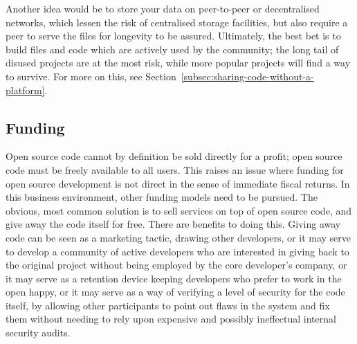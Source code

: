 Another idea would be to store your data on peer-to-peer or decentralised networks, which lessen the risk of centralised storage facilities, but also require a peer to serve the files for longevity to be assured. Ultimately, the best bet is to build files and code which are actively used by the community; the long tail of disused projects are at the most risk, while more popular projects will find a way to survive. For more on this, see Section~\ref{subsec:sharing-code-without-a-platform}.







\subsection{Funding}
\label{subsec:oss-funding}

Open source code cannot by definition be sold directly for a profit; open source code must be freely available to all users. This raises an issue where funding for open source development is not direct in the sense of immediate fiscal returns. In this business environment, other funding models need to be pursued. The obvious, most common solution is to sell services on top of open source code, and give away the code itself for free. There are benefits to doing this. Giving away code can be seen as a marketing tactic, drawing other developers, or it may serve to develop a community of active developers who are interested in giving back to the original project without being employed by the core developer's company, or it may serve as a retention device keeping developers who prefer to work in the open happy, or it may serve as a way of verifying a level of security for the code itself, by allowing other participants to point out flaws in the system and fix them without needing to rely upon expensive and possibly ineffectual internal security audits.

